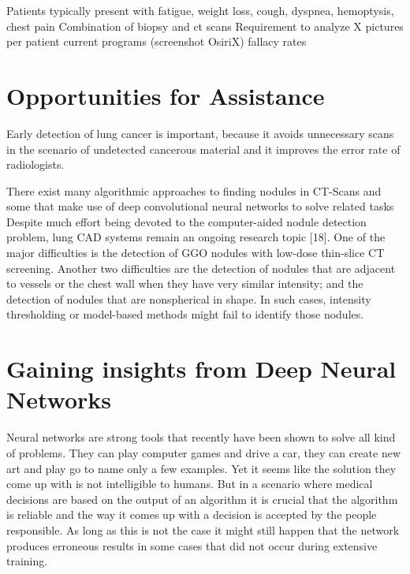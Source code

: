 \documentclass[main.tex]{subfiles}
\begin{document}
Patients typically present with fatigue, weight loss, cough, dyspnea, hemoptysis, chest pain
Combination of biopsy and ct scans
Requirement to analyze X pictures per patient
current programs (screenshot OsiriX)
fallacy rates

\section{Opportunities for Assistance}

Early detection of lung cancer is important, because it avoids unnecessary scans in the scenario of undetected cancerous material and it improves the error rate of radiologists.

There exist many algorithmic approaches to finding nodules in CT-Scans \cite{papers_classical} and some that
make use of deep convolutional neural networks to solve related tasks \cite{papers_dnn}\\

Despite much effort being devoted to the computer-aided nodule detection problem, lung CAD systems remain an ongoing
research topic [18]. One of the major difficulties is the detection of GGO nodules with low-dose thin-slice CT screening. Another two difficulties are the detection of nodules that are adjacent to vessels or the chest wall when they have very similar intensity; and the detection of nodules that are nonspherical in shape. In such cases, intensity thresholding or model-based methods might fail to identify those nodules.

\section{Gaining insights from Deep Neural Networks}
Neural networks are strong tools that recently have been shown to solve all kind of problems. They can play
computer games and drive a car, they can create new art and play go to name only a few examples. Yet it seems like the solution they come up with is not intelligible to humans. But in a scenario where medical decisions are based on the output of an algorithm it is crucial that the algorithm is reliable and the way it comes up with a decision is accepted by the people responsible. As long as this is not the case it might still happen that the network produces erroneous results in some cases that did not occur during extensive training.
\end{document}
